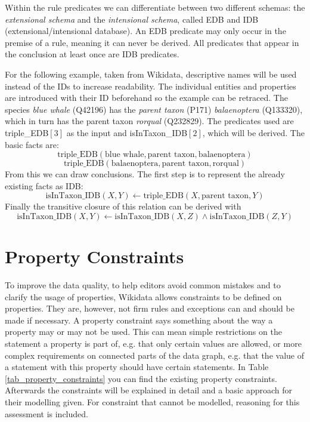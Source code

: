 \documentclass[hyperref,bachelorofscience,fleqn]{cgvpub}
\begin{document}
Within the rule predicates we can differentiate between two different schemas: the \emph{extensional schema} and the \emph{intensional schema}, called EDB and IDB (extensional/intensional database). An EDB predicate may only occur in the premise of a rule, meaning it can never be derived. All predicates that appear in the conclusion at least once are IDB predicates.

For the following example, taken from Wikidata, descriptive names will be used instead of the IDs to increase readability. The individual entities and properties are introduced with their ID beforehand so the example can be retraced. The species \emph{blue whale} (Q42196) has the \emph{parent taxon} (P171) \emph{balaenoptera} (Q133320), which in turn has the parent taxon \emph{rorqual} (Q232829). The predicates used are triple\_EDB\([3]\) as the input and isInTaxon\_IDB\([2]\), which will be derived. The basic facts are:
\[\text{triple\_EDB}(\text{blue whale}, \text{parent taxon}, \text{balaenoptera})\]
\[\text{triple\_EDB}(\text{balaenoptera}, \text{parent taxon}, \text{rorqual})\]
From this we can draw conclusions. The first step is to represent the already existing facts as IDB:
\[\text{isInTaxon\_IDB}(X, Y) \leftarrow \text{triple\_EDB}(X, \text{parent taxon}, Y)\]
Finally the transitive closure of this relation can be derived with
\[\text{isInTaxon\_IDB}(X, Y) \leftarrow \text{isInTaxon\_IDB}(X, Z) \wedge \text{isInTaxon\_IDB}(Z, Y)\]

\chapter{Property Constraints}

To improve the data quality, to help editors avoid common mistakes and to clarify the usage of properties, Wikidata allows constraints to be defined on properties. They are, however, not firm rules and exceptions can and should be made if necessary. A property constraint says something about the way a property may or may not be used. This can mean simple restrictions on the statement a property is part of, e.g. that only certain values are allowed, or more complex requirements on connected parts of the data graph, e.g. that the value of a statement with this property should have certain statements. In Table \ref{tab_property_constraints} you can find the existing property constraints. Afterwards the constraints will be explained in detail and a basic approach for their modelling given. For constraint that cannot be modelled, reasoning for this assessment is included.
\end{document}
